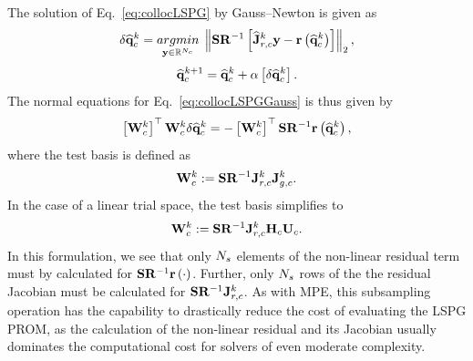 The solution of Eq.~\ref{eq:collocLSPG} by Gauss--Newton is given as
%
\begin{equation}\label{eq:collocLSPGGauss}
    \delta \consVecCoef^{\newtonIdx} = \argmin{\dummyVec \inROne{\numConsModes}} \left\Vert \sampMat \resScaleInv \left[\jacobResCoefCons^{\newtonIdx} \dummyVec - \resFunc{\consVecCoef^{\newtonIdx}}\right] \right\Vert_2,
\end{equation}
\begin{equation}
    \mathbf{\widehat{q}}_{c}^{k + 1} = \mathbf{\widehat{q}}_{c}^{k} + \alpha \left[ \delta \mathbf{\widehat{q}}_{c}^{k} \right].
\end{equation}
%
The normal equations for Eq.~\ref{eq:collocLSPGGauss} is thus given by
%
\begin{equation}
    \left[\testBasisCons^{\newtonIdx}\right]^\top \testBasisCons^{\newtonIdx} \delta \consVecCoef^{\newtonIdx} = -\left[\testBasisCons^{\newtonIdx}\right]^\top \sampMat \resScaleInv \resFunc{\consVecCoef^{\newtonIdx}},
\end{equation}
%
where the test basis is defined as
%
\begin{equation}
    \testBasisCons^\newtonIdx \defEq \sampMat \resScaleInv \jacobResCons^\newtonIdx \jacobDecodeCons^{\newtonIdx}.
\end{equation}
%
In the case of a linear trial space, the test basis simplifies to
%
\begin{equation}
    \testBasisCons^\newtonIdx \defEq \sampMat \resScaleInv \jacobResCons^\newtonIdx \consScale \consTrial.
\end{equation}
%
In this formulation, we see that only $N_s$ elements of the non-linear residual term must by calculated for $\sampMat \resScaleInv \resFunc{\cdot}$. Further, only $N_s$ rows of the the residual Jacobian must be calculated for $\sampMat \resScaleInv \jacobResCons^\newtonIdx$. As with MPE, this subsampling operation has the capability to drastically reduce the cost of evaluating the LSPG PROM, as the calculation of the non-linear residual and its Jacobian usually dominates the computational cost for solvers of even moderate complexity.

